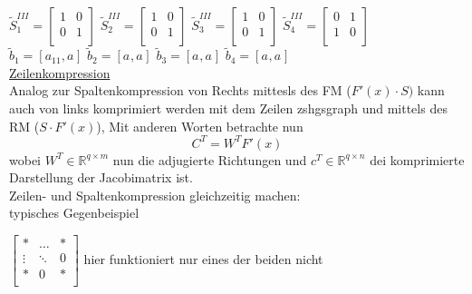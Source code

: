 $\tilde{S}_1^{III} = \begin{bmatrix}
1&0\\
0&1\\
\end{bmatrix}$
$\tilde{S}_2^{III} = \begin{bmatrix}
1&0\\
0&1\\
\end{bmatrix}$
$\tilde{S}_3^{III} = \begin{bmatrix}
1&0\\
0&1\\
\end{bmatrix}$
$\tilde{S}_4^{III} = \begin{bmatrix}
0&1\\
1&0\\
\end{bmatrix}$\\
$\tilde{b}_1 = [a_{11},a_{}]$
$\tilde{b}_2 = [a_{},a_{}]$
$\tilde{b}_3 = [a_{},a_{}]$
$\tilde{b}_4 = [a_{},a_{}]$\\

\noindent\underline{Zeilenkompression}\\
Analog zur Spaltenkompression von Rechts mittesls des FM ($F'(x)\cdot S)$ kann auch von links komprimiert werden mit dem Zeilen
zshgsgraph und mittels des RM ($S\cdot F'(x)$),
Mit anderen Worten betrachte nun
$$ C^T = W^T F'(x)$$
wobei $W^T \in \mathbb{R}^{q\times m}$ nun die adjugierte Richtungen und $c^T \in \mathbb{R}^{q \times n}$ dei komprimierte Darstellung der Jacobimatrix ist.\\

\noindent
Zeilen- und Spaltenkompression gleichzeitig machen:\\
typisches Gegenbeispiel

$\begin{bmatrix}
* & \dots & * \\
\vdots & \ddots & 0\\
*	&	0	& *\\
\end{bmatrix}$
hier funktioniert nur eines der beiden nicht